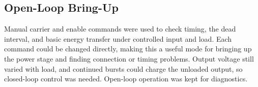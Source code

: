 \subsection{Open-Loop Bring-Up}
\label{sec:ctrl-v0}

Manual carrier and enable commands were used to check timing, the dead interval, and basic energy transfer under controlled input and load. Each command could be changed directly, making this a useful mode for bringing up the power stage and finding connection or timing problems. Output voltage still varied with load, and continued bursts could charge the unloaded output, so closed-loop control was needed. Open-loop operation was kept for diagnostics.

